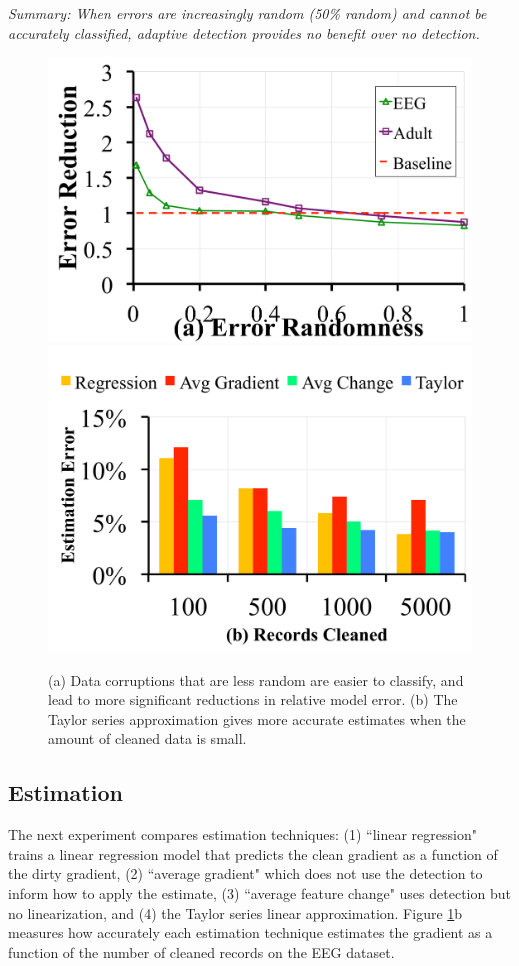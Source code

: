 \vspace{0.25em}

\noindent \emph{Summary: When errors are increasingly random (50\% random) and cannot be accurately classified, adaptive detection provides no benefit over no detection. }

\begin{figure}[ht!]
\centering
 \includegraphics[width=0.49\columnwidth]{exp/exp5a.pdf}
 \includegraphics[width=0.49\columnwidth]{exp/exp12.pdf}
 \caption{(a) Data corruptions that are less random are easier to classify, and lead to more significant reductions in relative model error. (b) The Taylor series approximation gives more accurate estimates when the amount of cleaned data is small. \label{tradeoffs2}}\vspace{-2em}
\end{figure}

\vspace{1.5em}
\subsection{Estimation}\label{est}
The next experiment compares estimation techniques: (1) ``linear regression" trains a linear regression model that predicts the clean gradient as a function of the dirty gradient, (2) ``average gradient" which does not use the detection to inform how to apply the estimate, (3) ``average feature change" uses detection but no linearization, and (4) the Taylor series linear approximation.
Figure \ref{tradeoffs2}b measures how accurately each estimation technique estimates the gradient as a function of the number of cleaned records on the EEG dataset.

